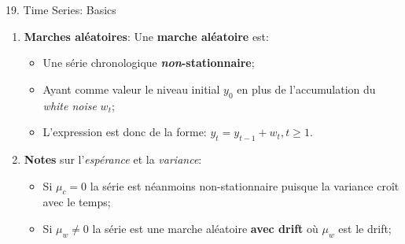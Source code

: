 \documentclass[12pt, titlepage, french]{report}
\begin{document}
\begin{CHPT_SUMM}{19. Time Series: Basics}
\begin{enumerate}
\begin{itemize}
		\texttt{[image: src/regime-change-wave.png]}
		\item	Cette idée d'observer des tendances dans des graphiques d'ondes sonores est exactement la même idée que le \textit{time series filtering};
		\item[]	On cherche à identifier des tendances, des cycles, des changements de régime, etc. dans une série qui peuvent sembler d'être aléatoires;
		\item	Dans le même ordre d'idée, lorsqu'un musicien joue son instrument on imagine que ce n'est pas parfait et qu'il y a un certain niveau d'erreur!
		\item[]	Ceci est donc le \textbf{white noise}, l'erreur aléatoire de la fréquence observée à la fréquence attendue;
		\item[]	Alors, pour néanmoins reconnaître une fréquence d'instrument imparfait, on alloue une variabilité (ou déviance) à la série \og parfaite \fg{};
		\item	La partie inexplicable par les patterns qui demeure est dite d'être \textbf{irréductible} et est donc traitée comme du \textbf{\textit{white noise}};
		\end{itemize}
	\item	\textbf{Marches aléatoires}: Une \textbf{marche aléatoire} est:
		\begin{itemize}
		\item	Une série chronologique \textbf{\textit{non}-stationnaire};
		\item	Ayant comme valeur le niveau initial $y_{0}$ en plus de l'accumulation du \textit{white noise} $w_{t}$;
		\item	L'expression est donc de la forme: $y_{t} = y_{t - 1} + w_{t}, t \ge 1$.
		\end{itemize}
	\item[]	\textbf{Notes} sur l'\textit{espérance} et la \textit{variance}:
		\begin{itemize}
		\item	Si $\mu_{c} = 0$ la série est néanmoins non-stationnaire puisque la variance croît avec le temps;
		\item	Si $\mu_{w} \neq 0$ la série est une marche aléatoire \textbf{avec drift} où $\mu_{w}$ est le drift;

\end{itemize}
\end{enumerate}
\end{CHPT_SUMM}
\end{document}
